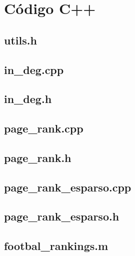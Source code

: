 
\newpage
\section{Código C++} \label{sec:codigo}
\subsection{utils.h}

\subsection{in_deg.cpp}

\subsection{in_deg.h}

\subsection{page_rank.cpp}

\subsection{page_rank.h}

\subsection{page_rank_esparso.cpp}

\subsection{page_rank_esparso.h}

\subsection{footbal_rankings.m}
